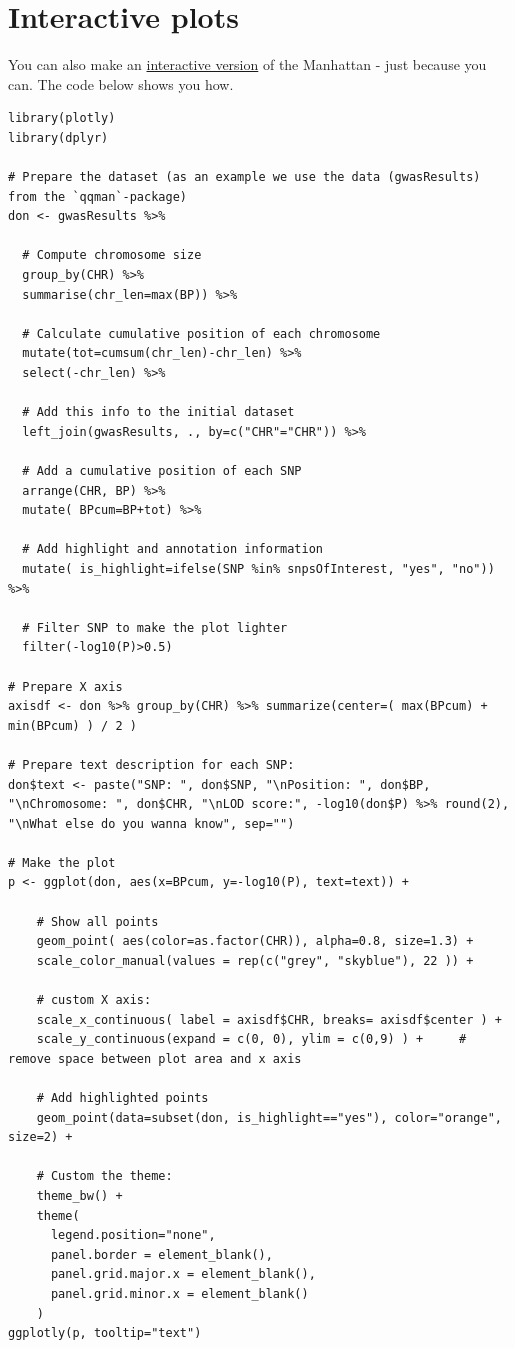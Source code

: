 \documentclass[
]{book}
\begin{document}
\hypertarget{interactive-plots}{%
\section{Interactive plots}\label{interactive-plots}}

You can also make an \href{https://r-graph-gallery.com/101_Manhattan_plot.html}{interactive version} of the Manhattan - just because you can. The code below shows you how.

\begin{lstlisting}
library(plotly)
library(dplyr)

# Prepare the dataset (as an example we use the data (gwasResults) from the `qqman`-package)
don <- gwasResults %>%

  # Compute chromosome size
  group_by(CHR) %>%
  summarise(chr_len=max(BP)) %>%

  # Calculate cumulative position of each chromosome
  mutate(tot=cumsum(chr_len)-chr_len) %>%
  select(-chr_len) %>%

  # Add this info to the initial dataset
  left_join(gwasResults, ., by=c("CHR"="CHR")) %>%

  # Add a cumulative position of each SNP
  arrange(CHR, BP) %>%
  mutate( BPcum=BP+tot) %>%

  # Add highlight and annotation information
  mutate( is_highlight=ifelse(SNP %in% snpsOfInterest, "yes", "no")) %>%

  # Filter SNP to make the plot lighter
  filter(-log10(P)>0.5)

# Prepare X axis
axisdf <- don %>% group_by(CHR) %>% summarize(center=( max(BPcum) + min(BPcum) ) / 2 )

# Prepare text description for each SNP:
don$text <- paste("SNP: ", don$SNP, "\nPosition: ", don$BP, "\nChromosome: ", don$CHR, "\nLOD score:", -log10(don$P) %>% round(2), "\nWhat else do you wanna know", sep="")

# Make the plot
p <- ggplot(don, aes(x=BPcum, y=-log10(P), text=text)) +

    # Show all points
    geom_point( aes(color=as.factor(CHR)), alpha=0.8, size=1.3) +
    scale_color_manual(values = rep(c("grey", "skyblue"), 22 )) +

    # custom X axis:
    scale_x_continuous( label = axisdf$CHR, breaks= axisdf$center ) +
    scale_y_continuous(expand = c(0, 0), ylim = c(0,9) ) +     # remove space between plot area and x axis

    # Add highlighted points
    geom_point(data=subset(don, is_highlight=="yes"), color="orange", size=2) +

    # Custom the theme:
    theme_bw() +
    theme(
      legend.position="none",
      panel.border = element_blank(),
      panel.grid.major.x = element_blank(),
      panel.grid.minor.x = element_blank()
    )
ggplotly(p, tooltip="text")
\end{lstlisting}
\end{document}

